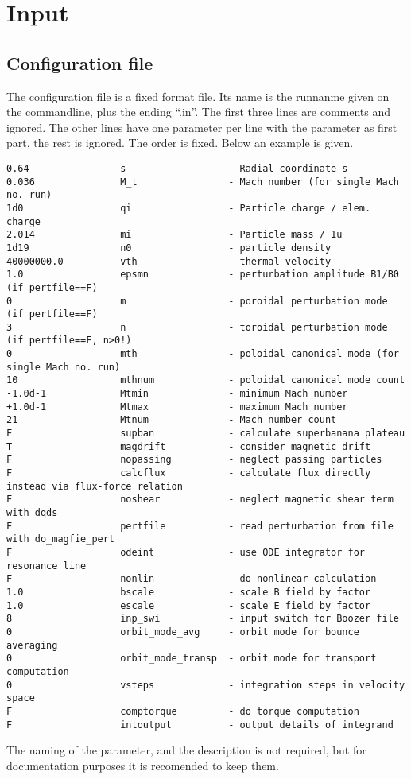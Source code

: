 \chapter{Input}

\section{Configuration file}
The configuration file is a fixed format file. Its name is the runnanme
given on the commandline, plus the ending ``.in''.
The first three lines are comments and ignored. The other lines have
one parameter per line with the parameter as first part, the rest is
ignored. The order is fixed. Below an example is given.
\begin{verbatim}
0.64                s                  - Radial coordinate s
0.036               M_t                - Mach number (for single Mach no. run)
1d0                 qi                 - Particle charge / elem. charge
2.014               mi                 - Particle mass / 1u
1d19                n0                 - particle density
40000000.0          vth                - thermal velocity
1.0                 epsmn              - perturbation amplitude B1/B0 (if pertfile==F)
0                   m                  - poroidal perturbation mode (if pertfile==F)
3                   n                  - toroidal perturbation mode (if pertfile==F, n>0!)
0                   mth                - poloidal canonical mode (for single Mach no. run)
10                  mthnum             - poloidal canonical mode count
-1.0d-1             Mtmin              - minimum Mach number
+1.0d-1             Mtmax              - maximum Mach number
21                  Mtnum              - Mach number count
F                   supban             - calculate superbanana plateau
T                   magdrift           - consider magnetic drift
F                   nopassing          - neglect passing particles
F                   calcflux           - calculate flux directly instead via flux-force relation
F                   noshear            - neglect magnetic shear term with dqds
F                   pertfile           - read perturbation from file with do_magfie_pert
F                   odeint             - use ODE integrator for resonance line
F                   nonlin             - do nonlinear calculation
1.0                 bscale             - scale B field by factor
1.0                 escale             - scale E field by factor
8                   inp_swi            - input switch for Boozer file
0                   orbit_mode_avg     - orbit mode for bounce averaging
0                   orbit_mode_transp  - orbit mode for transport computation
0                   vsteps             - integration steps in velocity space
F                   comptorque         - do torque computation
F                   intoutput          - output details of integrand
\end{verbatim}
The naming of the parameter, and the description is not required, but
for documentation purposes it is recomended to keep them.

